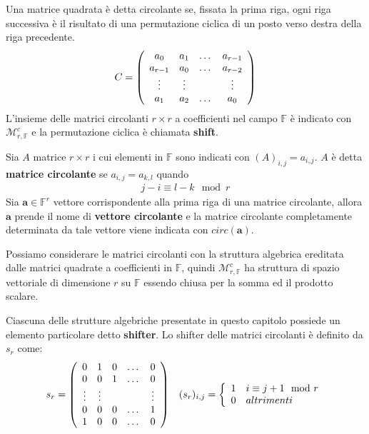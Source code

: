 Una matrice quadrata è detta circolante se, fissata la prima riga, ogni riga successiva è il risultato di una permutazione ciclica di un posto verso destra della riga precedente.
\begin{align*}
C =
\left(
\begin{array} {c c c c }
a_0 & a_1 & \dots & a_{r-1}   \\
a_{r-1} & a_0 & \dots & a_{r-2}   \\
\vdots & \vdots &  & \vdots   \\
a_{1} & a_2 & \dots & a_{0}   \\
\end{array}
\right)
\end{align*}
L'insieme delle matrici circolanti $r\times r$ a coefficienti nel campo $\mathbb{F}$ è indicato con $\mathcal{M}_{r,\mathbb{F} }^{c}$ e la permutazione ciclica è chiamata {\bf shift}.
\begin{definizione}
Sia $A$ matrice $r \times r$ i cui elementi in $\mathbb{F}$ sono indicati con $(A)_{i,j} = a_{i,j}$. $A$ è
detta {\bf matrice circolante} se  $a_{i,j} = a_{k,l}$ quando
\begin{align*}
   j-i \equiv l-k \mod{r}
\end{align*}
Sia $\mathbf{a} \in \mathbb{F}^{r}$ vettore corrispondente alla
prima riga di una matrice circolante, allora $\mathbf{a}$ prende il nome di {\bf
vettore circolante} e la matrice circolante completamente determinata da tale
vettore viene indicata con $circ(\mathbf{a})$.
\end{definizione}

\noindent
Possiamo considerare le matrici circolanti con la struttura algebrica
ereditata
dalle matrici quadrate a coefficienti in $\mathbb{F}$,
quindi $\mathcal{M}_{r,\mathbb{F} }^{c}$ ha struttura di spazio vettoriale di
dimensione $r$ su $\mathbb{F}$ essendo chiusa per la somma ed il prodotto scalare.

Ciascuna delle strutture algebriche presentate in questo capitolo possiede un
elemento particolare detto {\bf shifter}. Lo shifter delle matrici circolanti è
definito da $s_r$ come:
\begin{align*}
s_r =
\left(
\begin{array} {c c c c c }
0 & 1 & 0 & \dots & 0   \\
0 & 0 & 1 & \dots & 0   \\
\vdots & \vdots &  & & \vdots   \\
0 & 0 & 0 & \dots & 1   \\
1 & 0 & 0 & \dots & 0   \\
\end{array}
\right)
&
&
(s_r)_{i,j} =
\left\lbrace
\begin{array} {c l}
1 & i \equiv j+1 \mod{r}  \\
0 & altrimenti
\end{array}
\right.
\end{align*}

